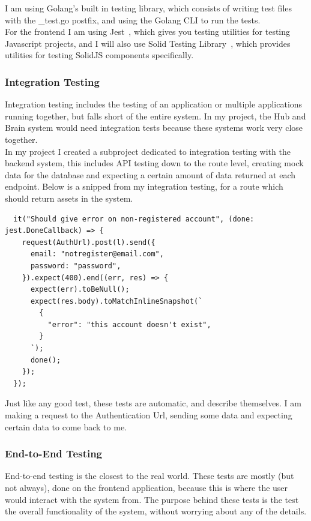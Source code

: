\documentclass[titlepage]{article}
\begin{document}
I am using Golang's built in testing library, which consists of writing test files with the \_test.go postfix, and using the Golang CLI to run the tests. \\

For the frontend I am using Jest~\cite{jest}, which gives you testing utilities for testing Javascript projects, and I will also use Solid Testing Library~\cite{solid_testing}, which provides utilities for testing SolidJS components specifically.

\subsubsection{Integration Testing}
Integration testing includes the testing of an application or multiple applications running together, but falls short of the entire system. In my project, the Hub and Brain system would need integration tests because these systems work very close together. \\

In my project I created a subproject dedicated to integration testing with the backend system, this includes API testing down to the route level, creating mock data for the database and expecting a certain amount of data returned at each endpoint. Below is a snipped from my integration testing, for a route which should return assets in the system.

\begin{verbatim}
  it("Should give error on non-registered account", (done: jest.DoneCallback) => {
    request(AuthUrl).post(l).send({
      email: "notregister@email.com",
      password: "password",
    }).expect(400).end((err, res) => {
      expect(err).toBeNull();
      expect(res.body).toMatchInlineSnapshot(`
        {
          "error": "this account doesn't exist",
        }
      `);
      done();
    });
  });
\end{verbatim}

Just like any good test, these tests are automatic, and describe themselves. I am making a request to the Authentication Url, sending some data and expecting certain data to come back to me. \\

\subsubsection{End-to-End Testing}
End-to-end testing is the closest to the real world. These tests are mostly (but not always), done on the frontend application, because this is where the user would interact with the system from. The purpose behind these tests is the test the overall functionality of the system, without worrying about any of the details. \\
\end{document}
